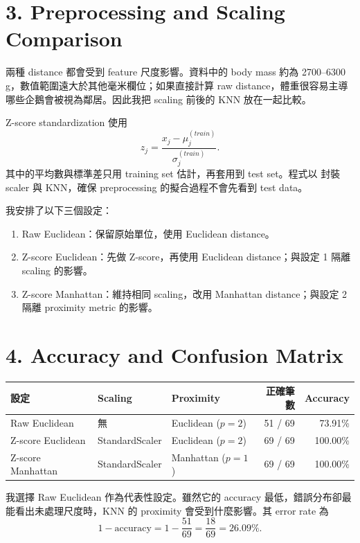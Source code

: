 \section*{3. Preprocessing and Scaling Comparison}
\sectionrule

兩種 distance 都會受到 feature 尺度影響。資料中的 body mass 約為 2700--6300 g，數值範圍遠大於其他毫米欄位；如果直接計算 raw distance，體重很容易主導哪些企鵝會被視為鄰居。因此我把 scaling 前後的 KNN 放在一起比較。

Z-score standardization 使用
\[
z_j=\frac{x_j-\mu_j^{(train)}}{\sigma_j^{(train)}}.
\]
其中的平均數與標準差只用 training set 估計，再套用到 test set。程式以  封裝 scaler 與 KNN，確保 preprocessing 的擬合過程不會先看到 test data。

我安排了以下三個設定：

\begin{enumerate}[leftmargin=1.7em,itemsep=0.35em]
  \item Raw Euclidean：保留原始單位，使用 Euclidean distance。
  \item Z-score Euclidean：先做 Z-score，再使用 Euclidean distance；與設定 1 隔離 scaling 的影響。
  \item Z-score Manhattan：維持相同 scaling，改用 Manhattan distance；與設定 2 隔離 proximity metric 的影響。
\end{enumerate}

\section*{4. Accuracy and Confusion Matrix}
\sectionrule

\begin{table}[H]
\centering
\small
\begin{tabularx}{\linewidth}{L{3.7cm}L{2.4cm}Yrr}
\toprule
\textbf{設定} & \textbf{Scaling} & \textbf{Proximity} & \textbf{正確筆數} & \textbf{Accuracy} \\
\midrule
Raw Euclidean & 無 & Euclidean ($p=2$) & 51 / 69 & 73.91\% \\
Z-score Euclidean & StandardScaler & Euclidean ($p=2$) & 69 / 69 & 100.00\% \\
Z-score Manhattan & StandardScaler & Manhattan ($p=1$) & 69 / 69 & 100.00\% \\
\bottomrule
\end{tabularx}
\end{table}

我選擇 Raw Euclidean 作為代表性設定。雖然它的 accuracy 最低，錯誤分布卻最能看出未處理尺度時，KNN 的 proximity 會受到什麼影響。其 error rate 為
\[
1-\text{accuracy}=1-\frac{51}{69}=\frac{18}{69}=26.09\%.
\]

